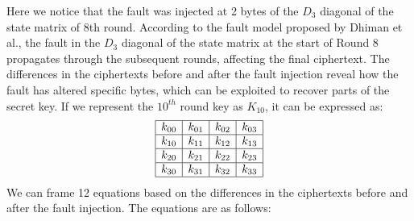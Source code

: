 Here we notice that the fault was injected at 2 bytes of the $D_3$ diagonal of the state matrix of 8th round. According to the fault model proposed by Dhiman et al.,\cite{Saha2009ADF} the fault in the $D_3$ diagonal of the state matrix at the start of Round 8 propagates through the subsequent rounds, affecting the final ciphertext. The differences in the ciphertexts before and after the fault injection reveal how the fault has altered specific bytes, which can be exploited to recover parts of the secret key. If we represent the $10^{th}$ round key as \(K_{10}\), it can be expressed as:
\[
    \begin{array}{|c|c|c|c|}
        \hline
        k_{00} & k_{01} & k_{02} & k_{03} \\
        \hline
        k_{10} & k_{11} & k_{12} & k_{13} \\
        \hline
        k_{20} & k_{21} & k_{22} & k_{23} \\
        \hline
        k_{30} & k_{31} & k_{32} & k_{33} \\
        \hline
        \end{array}
\]
We can frame 12 equations based on the differences in the ciphertexts before and after the fault injection. The equations are as follows:
